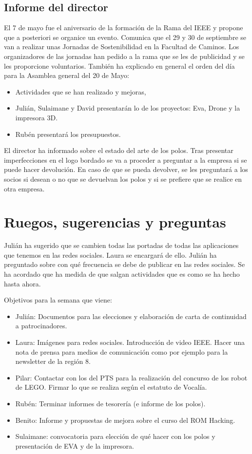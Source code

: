 \documentclass[12pt,twoside,openany,a4paper]{book}
\begin{document}
    \subsection{Informe del director}
    El 7 de mayo fue el aniversario de la formación de la Rama del IEEE y propone que a posteriori se organice un evento.
    Comunica que el 29 y 30 de septiembre se van a realizar unas Jornadas de Sostenibilidad en la Facultad de Caminos. Los organizadores de las jornadas han pedido a la rama que se les de publicidad y se les proporcione voluntarios.
    También ha explicado en general el orden del día para la Asamblea general del 20 de Mayo:
    \begin{itemize}
        \item Actividades que se han realizado y mejoras,
        \item Julián, Sulaimane y David presentarán lo de los proyectos: Eva, Drone y la impresora 3D.
        \item Rubén presentará los presupuestos.
    \end{itemize}

    El director ha informado sobre el estado del arte de los polos. Tras presentar imperfecciones en el logo bordado se va a proceder a preguntar a la empresa si se puede hacer devolución. En caso de que se pueda devolver, se les preguntará a los socios si desean o no que se devuelvan los polos y si se prefiere que se realice en otra empresa.

    \section{Ruegos, sugerencias y preguntas}
    Julián ha sugerido que se cambien todas las portadas de todas las aplicaciones que tenemos en las redes sociales. Laura se encargará de ello.
    Julián ha preguntado sobre con qué frecuencia se debe de publicar en las redes sociales. Se ha acordado que ha medida de que salgan actividades que es como se ha hecho hasta ahora.

    Objetivos para la semana que viene:
    \begin{itemize}
        \item Julián: Documentos para las elecciones y elaboración de carta de continuidad a patrocinadores.
        \item Laura: Imágenes para redes sociales. Introducción de video IEEE. Hacer una nota de prensa para medios de comunicación como por ejemplo para la newsletter de la región 8.
        \item Pilar: Contactar con los del PTS para la realización del concurso de los robot de LEGO. Firmar lo que se realiza según el estatuto de Vocalía.
        \item Rubén: Terminar informes de tesorería (e informe de los polos).
        \item Benito: Informe y propuestas de mejora sobre el curso del ROM Hacking.
        \item Sulaimane: convocatoria para elección de qué hacer con los polos y presentación de EVA y de la impresora.
    \end{itemize}
\end{document}
